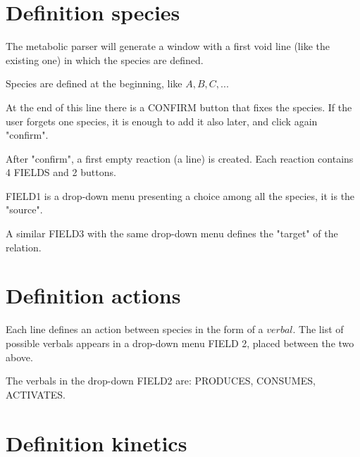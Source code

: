 \documentclass[11pt, oneside]{article}
\begin{document}
\section*{Definition species}

The metabolic parser will generate a window with a first void line (like the existing one) in which the species are defined.

Species are defined at the beginning, like $A, B, C, ...$

At the end of this line there is a CONFIRM button that fixes the species. If the user forgets one species, it is enough to add it also later, and click again "confirm".

After "confirm", a first empty reaction (a line) is created. Each reaction contains 4 FIELDS and 2 buttons.

FIELD1 is a drop-down menu presenting a choice among all the species, it is the "source".

A similar FIELD3 with the same drop-down menu defines the "target" of the relation.

 \section*{Definition actions}

Each line defines an action between species in the form of a $verbal$. The list of possible verbals appears in a drop-down menu FIELD 2, placed between the two above.

The verbals in the drop-down FIELD2 are: PRODUCES, CONSUMES, ACTIVATES.

 \section*{Definition kinetics}
 
\end{document}
